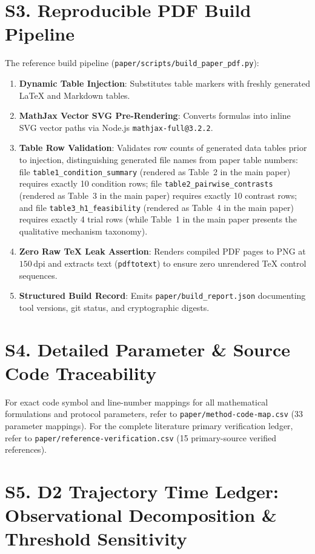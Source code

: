 \documentclass[10pt]{article}
\begin{document}
\section{S3. Reproducible PDF Build Pipeline}
The reference build pipeline (\texttt{paper/scripts/build\_paper\_pdf.py}):
\begin{enumerate}
    \item \textbf{Dynamic Table Injection}: Substitutes table markers with freshly generated LaTeX and Markdown tables.
    \item \textbf{MathJax Vector SVG Pre-Rendering}: Converts formulas into inline SVG vector paths via Node.js \texttt{mathjax-full@3.2.2}.
    \item \textbf{Table Row Validation}: Validates row counts of generated data tables prior to injection, distinguishing generated file names from paper table numbers: file \texttt{table1\_condition\_summary} (rendered as Table~2 in the main paper) requires exactly 10 condition rows; file \texttt{table2\_pairwise\_contrasts} (rendered as Table~3 in the main paper) requires exactly 10 contrast rows; and file \texttt{table3\_h1\_feasibility} (rendered as Table~4 in the main paper) requires exactly 4 trial rows (while Table~1 in the main paper presents the qualitative mechanism taxonomy).
    \item \textbf{Zero Raw TeX Leak Assertion}: Renders compiled PDF pages to PNG at $150\,\text{dpi}$ and extracts text (\texttt{pdftotext}) to ensure zero unrendered TeX control sequences.
    \item \textbf{Structured Build Record}: Emits \texttt{paper/build\_report.json} documenting tool versions, git status, and cryptographic digests.
\end{enumerate}

\section{S4. Detailed Parameter \& Source Code Traceability}
For exact code symbol and line-number mappings for all mathematical formulations and protocol parameters, refer to \texttt{paper/method-code-map.csv} (33 parameter mappings). For the complete literature primary verification ledger, refer to \texttt{paper/reference-verification.csv} (15 primary-source verified references).

\section{S5. D2 Trajectory Time Ledger: Observational Decomposition \& Threshold Sensitivity}
\end{document}
